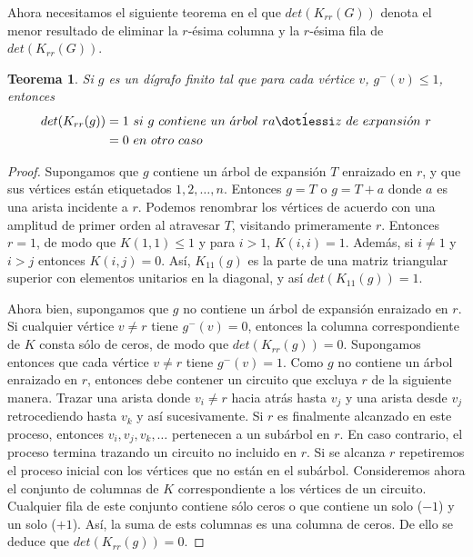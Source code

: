 \documentclass[10pt,a5paper]{book}
\newtheorem{teorema}{Teorema}[chapter]
\begin{document}
Ahora necesitamos el siguiente teorema en el que $det(K_{rr}(G))$ denota el menor resultado de eliminar la $r$-ésima columna y la $r$-ésima fila de $det(K_{rr}(G))$.

\begin{teorema}
Si $g$ es un dígrafo finito tal que para cada vértice $v$, $g^-(v) \le 1$, entonces
\begin{align}
det (K_{rr}(g)) & = 1\ si\ g\ contiene\ un\ \acute{a}rbol\ ra\acute{\dotlessi}z\ de\ expansi\acute{o}n\ r \nonumber\\
& = 0\ en\ otro\ caso\ \nonumber
\end{align}
\end{teorema}
\begin{proof}
Supongamos que $g$ contiene un árbol de expansión $T$ enraizado en $r$, y que sus vértices están etiquetados $1,2,\ldots,n$. Entonces $g = T$ o $g = T + a$ donde $a$ es una arista incidente a $r$. Podemos renombrar los vértices de acuerdo con una amplitud de primer orden al atravesar $T$, visitando primeramente $r$. Entonces $r = 1$, de modo que $K(1,1) \le 1$ y para $i > 1$, $K(i,i) = 1$. Además, si $i \ne 1$ y $i > j$ entonces $K(i,j) = 0$. Así, $K_{11}(g)$ es la parte de una matriz triangular superior con elementos unitarios en la diagonal, y así $det(K_{11}(g)) = 1$.

Ahora bien, supongamos que $g$ no contiene un árbol de expansión enraizado en $r$. Si cualquier vértice $v \ne r$ tiene $g^-(v) = 0$, entonces la columna correspondiente de $K$ consta sólo de ceros, de modo que $det(K_{rr}(g)) = 0$. Supongamos entonces que cada vértice $v \ne r$ tiene $g^-(v) = 1$. Como $g$ no contiene un árbol enraizado en $r$, entonces debe contener un circuito que excluya $r$ de la siguiente manera. Trazar una arista donde $v_i \ne r$ hacia atrás hasta $v_j$ y una arista desde $v_j$ retrocediendo hasta $v_k$ y así sucesivamente. Si $r$ es finalmente alcanzado en este proceso, entonces $v_i,v_j,v_k,\ldots$ pertenecen a un subárbol en $r$. En caso contrario, el proceso termina trazando un circuito no incluido en $r$. Si se alcanza $r$ repetiremos el proceso inicial con los vértices que no están en el subárbol. Consideremos ahora el conjunto de columnas de $K$ correspondiente a los vértices de un circuito. Cualquier fila de este conjunto contiene sólo ceros o que contiene un solo ($-1$) y un solo ($+1$). Así, la suma de ests columnas es una columna de ceros. De ello se deduce que $det(K_{rr}(g)) = 0$.
\end{proof}
\end{document}
